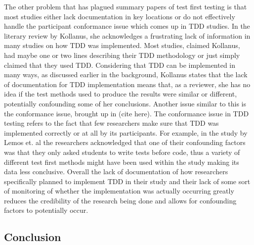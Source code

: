 \documentclass{sig-alternate}
\begin{document}
The other problem that has plagued summary papers of test first testing is that most studies either lack documentation in key locations or do not effectively handle the participant conformance issue which comes up in TDD studies.  In the literary review by Kollanus, she acknowledges a frustrating lack of information in many studies on how TDD was implemented.  Most studies, claimed Kollanus, had maybe one or two lines describing their TDD methodology or just simply claimed that they used TDD.  Considering that TDD can be implemented in many ways, as discussed earlier in the background, Kollanus states that the lack of documentation for TDD implementation means that, as a reviewer, she has no idea if the test methods used to produce the results were similar or different, potentially confounding some of her conclusions.  Another issue similar to this is the conformance issue, brought up in (cite here).  The conformance issue in TDD testing refers to the fact that few researchers make sure that TDD was implemented correctly or at all by its participants.  For example, in the study by Lemos et. al the researchers acknowledged that one of their confounding factors was that they only asked students to write tests before code, thus a variety of different test first methods might have been used within the study making its data less conclusive.   Overall the lack of documentation of how researchers specifically planned to implement TDD in their study and their lack of some sort of monitoring of whether the implementation was actually occurring greatly reduces the credibility of the research being done and allows for confounding factors to potentially occur. 

\subsection{Conclusion}
\end{document}
